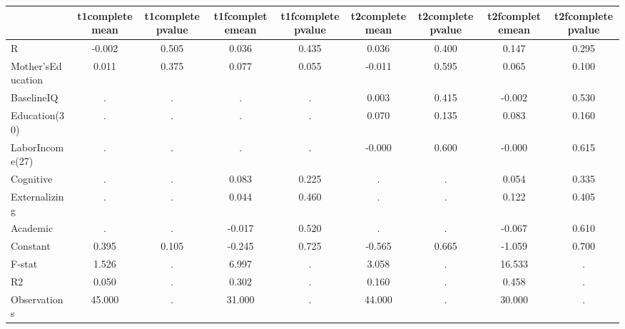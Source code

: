 \begin{table}[htbp]
\begin{tabular}{lcccccccc} \hline \hline
 & t1completemean  & t1completepvalue  & t1fcompletemean  & t1fcompletepvalue  & t2completemean  & t2completepvalue  & t2fcompletemean  & t2fcompletepvalue  \\  \hline 
R &    -0.002 &     0.505 &     0.036 &     0.435 &     0.036 &     0.400 &     0.147 &     0.295 \\  
Mother'sEducation &     0.011 &     0.375 &     0.077 &     0.055 &    -0.011 &     0.595 &     0.065 &     0.100 \\  
BaselineIQ &         . &         . &         . &         . &     0.003 &     0.415 &    -0.002 &     0.530 \\  
Education(30) &         . &         . &         . &         . &     0.070 &     0.135 &     0.083 &     0.160 \\  
LaborIncome(27) &         . &         . &         . &         . &    -0.000 &     0.600 &    -0.000 &     0.615 \\  
Cognitive &         . &         . &     0.083 &     0.225 &         . &         . &     0.054 &     0.335 \\  
Externalizing &         . &         . &     0.044 &     0.460 &         . &         . &     0.122 &     0.405 \\  
Academic &         . &         . &    -0.017 &     0.520 &         . &         . &    -0.067 &     0.610 \\  
Constant &     0.395 &     0.105 &    -0.245 &     0.725 &    -0.565 &     0.665 &    -1.059 &     0.700 \\  
F-stat &     1.526 &         . &     6.997 &         . &     3.058 &         . &    16.533 &         . \\  
R2 &     0.050 &         . &     0.302 &         . &     0.160 &         . &     0.458 &         . \\  
Observations &    45.000 &         . &    31.000 &         . &    44.000 &         . &    30.000 &         . \\  
\hline \hline \end{tabular}
\end{table}
